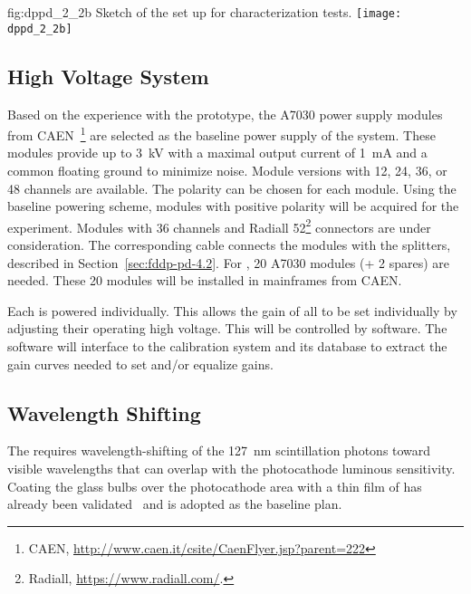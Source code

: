 \begin{dunefigure}{fig:dppd_2_2b}
{Sketch of the set up for  characterization tests.}
\texttt{[image: dppd\_2\_2b]}
\end{dunefigure}


\subsection{High Voltage System}
\label{sec:dp-pds-HV}

Based on the experience with the  prototype, the A7030 power supply modules from CAEN~\footnote{CAEN\texttrademark{}, \url{http://www.caen.it/csite/CaenFlyer.jsp?parent=222}} are selected as the baseline power supply of the   system. 
These modules provide up to \SI{3}{kV} with a maximal output current of \SI{1}{mA} and a common floating ground to minimize noise. Module versions with \num{12}, \num{24}, \num{36}, or \num{48}  channels are available. The  polarity can be chosen for each module. Using the baseline  powering scheme, modules with positive  polarity will be acquired for the experiment. Modules with \num{36}  channels and Radiall \num{52}\footnote{Radiall\texttrademark{}, \url{https://www.radiall.com/}.}  connectors are under consideration. The corresponding  cable connects the modules with the  splitters, described in Section~\ref{sec:fddp-pd-4.2}. For \dpnumpmtch {}, \num{20} A7030 modules (+ \num{2} spares) are needed. These \num{20}  modules will be installed in mainframes from CAEN.

Each  is powered individually.  This allows the gain of all  to be set individually by adjusting their operating high voltage.
This will be controlled by software. The software will interface to the  calibration system and its database to extract the gain curves needed to set and/or equalize gains.

\subsection{Wavelength Shifting}
\label{sec:dppd-wls}

The \dual {} requires wavelength-shifting of the \SI{127}{nm} scintillation photons toward visible wavelengths that can overlap with the photocathode luminous sensitivity. Coating the  glass bulbs over the photocathode area with a thin film of  has already been validated~\cite{Francini:2013lua} and is adopted as the baseline plan. 

